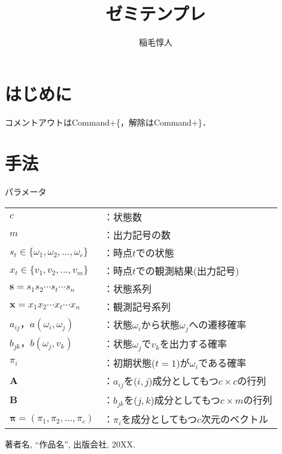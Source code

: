 \documentclass[12pt, aJ4]{jsarticle}
\begin{document}
\title{ゼミテンプレ}
\author{稲毛惇人}
\maketitle

\section{はじめに}
コメントアウトはCommand+\{，解除はCommand+\}．

\section{手法}
\begin{myframe}{パラメータ}
	\begin{tabular}{ll}
		$c$ & ：状態数 \\
		$m$ & ：出力記号の数 \\
		$s_{t} \in \{\omega_{1}, \omega_{2},..., \omega_{c}\}$ & ：時点$t$での状態 \\
		$x_{t} \in \{v_{1}, v_{2},..., v_{m}\}$ & ：時点$t$での観測結果(出力記号) \\
		$\mathbf{s} = s_{1}s_{2}\cdots s_{t} \cdots s_{n}$ & ：状態系列 \\
		$\mathbf{x} = x_{1}x_{2}\cdots x_{t} \cdots x_{n}$ & ：観測記号系列 \\
		$a_{ij}，a(\omega_{i}, \omega_{j})$ & ：状態$\omega_{i}$から状態$\omega_{j}$への遷移確率 \\
		$b_{jk}，b(\omega_{j}, v_{k})$ & ：状態$\omega_{j}$で$v_{k}$を出力する確率 \\
		$\pi_{i}$ & ：初期状態($t=1$)が$\omega_{i}$である確率 \\
		$\bm{A}$ & ：$a_{ij}$を($i,j$)成分としてもつ$c \times c$の行列 \\
		$\bm{B}$ & ：$b_{jk}$を($j,k$)成分としてもつ$c \times m$の行列 \\
		$\bm{\pi}=(\pi_{1}, \pi_{2}, ..., \pi_{c})$ & ：$\pi_{i}$を成分としてもつ$c$次元のベクトル
	\end{tabular}
\end{myframe}

\begin{thebibliography}{9}
	\renewcommand{\baselinestretch}{1.0}
	\small
		著者名, 
		``作品名'', 
		出版会社, 20XX.
\end{thebibliography}
		
\end{document}
